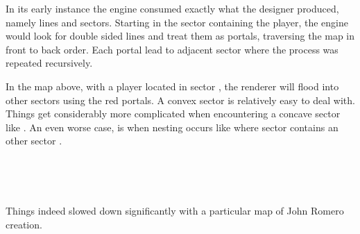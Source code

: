 In its early instance the engine consumed exactly what the designer produced, namely lines and sectors. Starting in the sector containing the player, the engine would look for double sided lines and treat them as portals, traversing the map in front to back order. Each portal lead to adjacent sector where the process was repeated recursively.\\
\par
{}
\par
\vspace{4mm}
In the map above, with a player located in sector , the renderer will flood into other sectors using the red portals. A convex sector  is relatively easy to deal with.  Things get considerably more complicated when encountering a concave sector like . An even worse case, is when nesting occurs like where sector  contains an other sector .\\
\par
{}\\
\par
{}\\
\par
Things indeed slowed down significantly with a particular map of John Romero creation.




